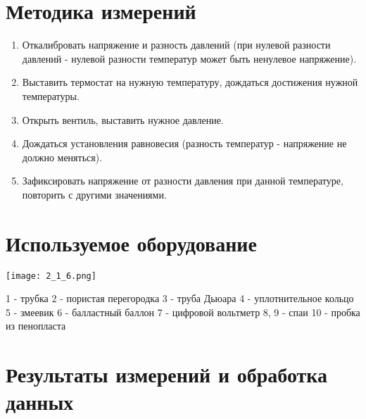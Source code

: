 \documentclass[1 pt]{article}
\begin{document}
\section{Методика измерений}
\begin{enumerate} 
  \item Откалибровать напряжение и разность давлений (при нулевой разности давлений - нулевой разности температур может быть ненулевое напряжение).
  \item Выставить термостат на нужную температуру, дождаться достижения нужной температуры.
  \item Открыть вентиль, выставить нужное давление.
  \item Дождаться установления равновесия (разность температур - напряжение не должно меняться).
  \item Зафиксировать напряжение от разности давления при данной температуре, повторить с другими значениями.
\end{enumerate}
\newpage
\section{Используемое оборудование}
\begin{center}
    \texttt{[image: 2\_1\_6.png]}
\end{center}
1 - трубка
2 - пористая перегородка
3 - труба Дьюара
4 - уплотнительное кольцо
5 - змеевик
6 - балластный баллон
7 - цифровой вольтметр
8, 9 - спаи
10 - пробка из пенопласта
\newpage
\section{Результаты измерений и обработка данных}
\begin{center}
    
\end{center}
\begin{center}
    
\end{center}
\begin{center}
    
\end{center}
\newpage
\end{document}
